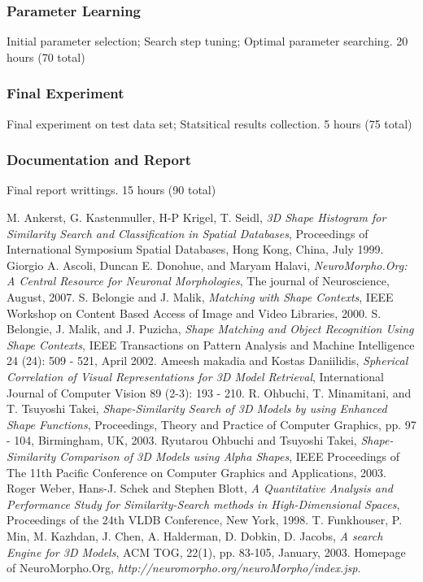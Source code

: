 \documentclass[letterpaper,11pt,oneside]{article}
\begin{document}
\subsubsection{Parameter Learning}
Initial parameter selection; Search step tuning; Optimal parameter searching. 20 hours (70 total)
\subsubsection{Final Experiment}
Final experiment on test data set; Statsitical results collection. 5 hours (75 total)
\subsubsection{Documentation and Report}
Final report writtings. 15 hours (90 total)


\begin{thebibliography}{9}
M. Ankerst, G. Kastenmuller, H-P Krigel, T. Seidl,
    \emph{3D Shape Histogram for Similarity Search and Classification in Spatial Databases},
    Proceedings of International Symposium Spatial Databases, Hong Kong, China, July 1999.
  Giorgio A. Ascoli, Duncan E. Donohue, and Maryam Halavi,
  \emph{NeuroMorpho.Org: A Central Resource for Neuronal Morphologies},
  The journal of Neuroscience, August, 2007.
  S. Belongie and J. Malik,
  \emph{Matching with Shape Contexts},
  IEEE Workshop on Content Based Access of Image and Video Libraries, 2000.
  S. Belongie, J. Malik, and J. Puzicha,
  \emph{Shape Matching and Object Recognition Using Shape Contexts}, 
  IEEE Transactions on Pattern Analysis and Machine Intelligence 24 (24): 509 - 521, April 2002.
    Ameesh makadia and Kostas Daniilidis,
    \emph{Spherical Correlation of Visual Representations for 3D Model Retrieval},
    International Journal of Computer Vision 89 (2-3): 193 - 210.
 R. Ohbuchi, T. Minamitani, and T. Tsuyoshi Takei,
\emph{Shape-Similarity Search of 3D Models by using Enhanced Shape Functions},
Proceedings, Theory and Practice of Computer Graphics, pp. 97 - 104, Birmingham, UK, 2003.
    Ryutarou Ohbuchi and Tsuyoshi Takei,
    \emph{Shape-Similarity Comparison of 3D Models using Alpha Shapes},
    IEEE Proceedings of The 11th Pacific Conference on Computer Graphics and Applications, 2003.
  Roger Weber, Hans-J. Schek and Stephen Blott,
  \emph{A Quantitative Analysis and Performance Study for Similarity-Search methods in High-Dimensional Spaces},
  Proceedings of the 24th VLDB Conference, New York, 1998.
  T. Funkhouser, P. Min, M. Kazhdan, J. Chen, A. Halderman, D. Dobkin, D. Jacobs,
  \emph{A search Engine for 3D Models},
  ACM TOG, 22(1), pp. 83-105, January, 2003.
  Homepage of NeuroMorpho.Org, \emph{http://neuromorpho.org/neuroMorpho/index.jsp}.
\end{thebibliography}
\end{document}
